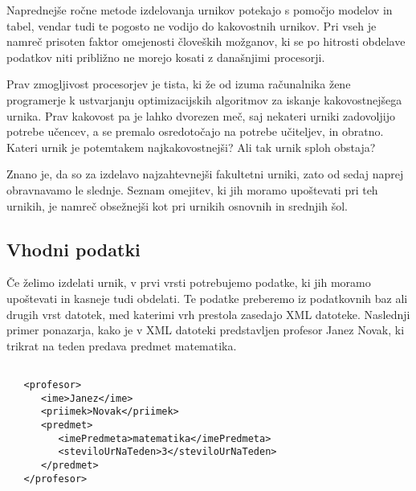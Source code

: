 \documentclass[a4paper,10pt]{article}
\begin{document}
   Naprednejše ročne metode izdelovanja urnikov potekajo s pomočjo modelov in tabel, vendar
   tudi te pogosto ne vodijo do kakovostnih urnikov. Pri vseh je namreč prisoten faktor
   omejenosti človeških možganov, ki se po hitrosti obdelave podatkov niti približno ne
   morejo kosati z današnjimi procesorji.
   
   Prav zmogljivost procesorjev je tista, ki že od izuma računalnika žene programerje k
   ustvarjanju optimizacijskih algoritmov za iskanje kakovostnejšega urnika. Prav kakovost
   pa je lahko dvorezen meč, saj nekateri urniki zadovoljijo potrebe učencev, a se premalo
   osredotočajo na potrebe učiteljev, in obratno. Kateri urnik je potemtakem najkakovostnejši?
   Ali tak urnik sploh obstaja?
   
   Znano je, da so za izdelavo najzahtevnejši fakultetni urniki, zato od sedaj naprej
   obravnavamo le slednje. Seznam omejitev, ki jih moramo upoštevati pri teh urnikih,
   je namreč obsežnejši kot pri urnikih osnovnih in srednjih šol.
   
\subsection{   Vhodni podatki}
   
   Če želimo izdelati urnik, v prvi vrsti potrebujemo podatke, ki jih moramo upoštevati in
   kasneje tudi obdelati. Te podatke preberemo iz podatkovnih baz ali drugih vrst datotek,
   med katerimi vrh prestola zasedajo XML datoteke. Naslednji primer ponazarja, kako je v
   XML datoteki predstavljen profesor Janez Novak, ki trikrat na teden predava predmet
   matematika.
   
   
\begin{verbatim}
   
   <profesor>
      <ime>Janez</ime>
      <priimek>Novak</priimek>
      <predmet>
         <imePredmeta>matematika</imePredmeta>
         <steviloUrNaTeden>3</steviloUrNaTeden>
      </predmet>
   </profesor>
   
\end{verbatim}
   
\end{document}
